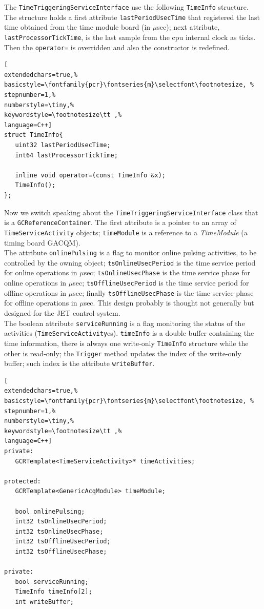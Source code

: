 The \texttt{TimeTriggeringServiceInterface} use the following \texttt{TimeInfo} structure. The structure holds a first attribute \texttt{lastPeriodUsecTime} that registered the last time obtained from the time module board (in $\mu$sec); next attribute, \texttt{lastProcessorTickTime}, is the last sample from the cpu internal clock as ticks. Then the \texttt{operator=} is overridden and also the constructor is redefined.

\begin{lstlisting}[
extendedchars=true,%
basicstyle=\fontfamily{pcr}\fontseries{m}\selectfont\footnotesize, %
stepnumber=1,%
numberstyle=\tiny,%
keywordstyle=\footnotesize\tt ,%
language=C++]
struct TimeInfo{
   uint32 lastPeriodUsecTime;
   int64 lastProcessorTickTime;

   inline void operator=(const TimeInfo &x);
   TimeInfo();
};
\end{lstlisting}

Now we switch speaking about the \texttt{TimeTriggeringServiceInterface} class that is a \texttt{GCReferenceContainer}.
The first attribute is a pointer to an array of \texttt{TimeServiceActivity} objects; \texttt{timeModule} is a reference to a \textit{TimeModule} (a timing board GACQM). \\


The attribute \texttt{onlinePulsing} is a flag to monitor online pulsing activities, to be controlled by the owning object; \texttt{tsOnlineUsecPeriod} is the time service period for online operations in $\mu$sec; \texttt{tsOnlineUsecPhase} is the time service phase for online operations in $\mu$sec; \texttt{tsOfflineUsecPeriod} is the time service period for offline operations in $\mu$sec; finally \texttt{tsOfflineUsecPhase} is the time service phase for offline operations in $\mu$sec. This design probably is thought not generally but designed for the JET control system. \\


The boolean attribute \texttt{serviceRunning} is a flag monitoring the status of the activities (\texttt{TimeServiceActivity}es). \texttt{timeInfo} is a double buffer containing the time information, there is always one write-only \texttt{TimeInfo} structure while the other is read-only; the \texttt{Trigger} method updates the index of the write-only buffer; such index is the attribute \texttt{writeBuffer}.

\begin{lstlisting}[
extendedchars=true,%
basicstyle=\fontfamily{pcr}\fontseries{m}\selectfont\footnotesize, %
stepnumber=1,%
numberstyle=\tiny,%
keywordstyle=\footnotesize\tt ,%
language=C++]
private:
   GCRTemplate<TimeServiceActivity>* timeActivities;

protected:
   GCRTemplate<GenericAcqModule> timeModule;

   bool onlinePulsing;
   int32 tsOnlineUsecPeriod;
   int32 tsOnlineUsecPhase;
   int32 tsOfflineUsecPeriod;
   int32 tsOfflineUsecPhase;

private:
   bool serviceRunning;
   TimeInfo timeInfo[2];
   int writeBuffer;
\end{lstlisting}

